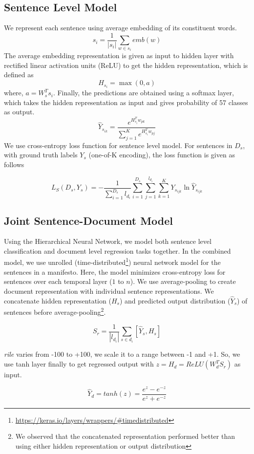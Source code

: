 \documentclass[11pt,a4paper]{article}
\begin{document}
\subsection{Sentence Level Model}
We represent each sentence using average embedding of its constituent words.
\[ s_{i} = \frac{1}{|s_{i}|}\sum_{w \in s_{i}} emb(w) \]
The average embedding representation is given as input to hidden layer with rectified linear activation units (ReLU) to get the hidden representation, which is defined as 
\[H_{s_{i}}= \max(0,a)\] where, $a = W_{s}^{T}s_{i}$. Finally, the predictions are obtained using a softmax layer, which takes the hidden representation as input and gives probability of 57 classes as output.
\[ \hat{Y}_{s_{ik}} = \frac{e^{H_{s_{i}}^T w_{pk}}}{\sum_{j=1}^{K}{e^{H_{s_{i}}^T w_{pj}}}}\]
We use cross-entropy loss function for sentence level model. For sentences in $D_{s}$, with ground truth labels $Y_{s}$ (one-of-K encoding), the loss function is given as follows

\[ L_{S}(D_{s},Y_{s})=-\frac{1}{\sum_{i=1}^{D_{s}}l_{d_{i}}}\sum_{i=1}^{D_{s}}\sum_{j=1}^{l_{d_{i}}}\sum_{k=1}^{K} Y_{s_{ijk}} \ln \hat{Y}_{s_{ijk}}  \]

\subsection{Joint Sentence-Document Model}
Using the Hierarchical Neural Network, we model both sentence level classification and document level regression tasks together. In the combined model, we use unrolled (time-distributed\footnote{\url{https://keras.io/layers/wrappers/\#timedistributed}}) neural network model for the sentences in a manifesto. Here, the model minimizes cross-entropy loss for sentences over each temporal layer ($1$ to $n$). We use average-pooling to create document representation with individual sentence representations. We concatenate hidden representation ($H_{s}$) and predicted output distribution ($\hat{Y}_{s}$) of sentences before average-pooling\footnote{We observed that the concatenated representation performed better than using either hidden representation or output distribution}.

\[ S_{r} = \frac{1}{|l_{d_{i}}|}\sum_{s \in d_{i}} [\hat{Y}_{s}, H_{s}] \]

\textit{rile} varies from -100 to +100, we scale it to a range between -1 and +1. So, we use tanh layer finally to get regressed output with $z = H_{d} = ReLU(W_{d}^{T}S_{r})$ as input.

\[ \hat{Y}_{d} = tanh(z) = \frac{e^z - e^{-z}}{e^z + e^{-z}} \]
\end{document}
